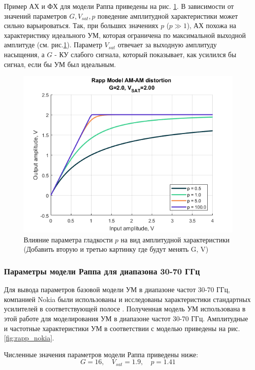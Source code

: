 Пример АХ и ФХ для модели Раппа приведены на  рис. \ref{fig:rapp_p_parameters}.
В зависимости от значений параметров $G, V_{sat}, p$ поведение амплитудной
характеристики может сильно варьироваться. Так, при больших значениях $p$
($p\gg 1$), АХ похожа на характеристику идеального УМ, которая ограничена
по максимальной выходной амплитуде (см. рис.\ref{fig:rapp_p_parameters}).
Параметр $V_{sat}$ отвечает за выходную амплитуду насыщения, а $G$ - КУ
слабого сигнала, который показывает, как усилился бы сигнал, если бы УМ был 
идеальным.
\begin{figure}[h!]
    \centering
    \includegraphics[width=0.7\linewidth]{figs/rapp_p.png}
    \caption{Влияние параметра гладкости $p$ на вид амплитудной
    характеристики (Добавить вторую и третью картинку где будут менять G, V)}
    \label{fig:rapp_p_parameters}
\end{figure}

\subsubsection{Параметры модели Раппа для диапазона 30-70 ГГц}
Для вывода параметров базовой модели УМ в диапазоне частот 30-70 ГГц,
компанией Nokia были использованы и исследованы характеристики стандартных
усилителей в соответствующей полосе \cite{nokia163314}. Полученная модель
УМ использована в этой работе для моделирования УМ в диапазоне частот 30-70
ГГц. Амплитудные и частотные характеристики УМ в соответствии с моделью
\cite{nokia163314} приведены на рис. \ref{fig:rapp_nokia}.

Численные значения параметров модели Раппа приведены ниже:
\begin{equation}
    G = 16, \quad V_{sat} = 1.9, \quad p = 1.41
\end{equation}

